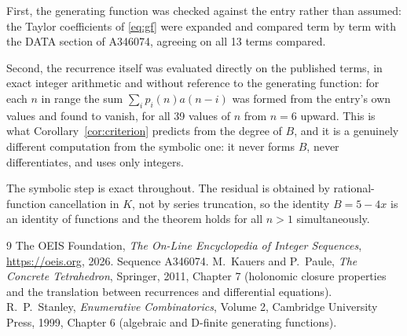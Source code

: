 \documentclass[11pt,a4paper]{article}
\theoremstyle{plain}
\theoremstyle{definition}
\begin{document}
First, the generating function was checked against the entry rather than assumed: the
Taylor coefficients of \eqref{eq:gf} were expanded and compared term by term with the DATA
section of A346074, agreeing on all 13 terms compared.

Second, the recurrence itself was evaluated directly on the published terms, in exact
integer arithmetic and without reference to the generating function: for each $n$ in range
the sum $\sum_{i}p_{i}(n)a(n-i)$ was formed from the entry's own values and found to
vanish, for all 39 values of $n$ from $n=6$ upward. This is what
Corollary~\ref{cor:criterion} predicts from the degree of $B$, and it is a genuinely
different computation from the symbolic one: it never forms $B$, never differentiates, and
uses only integers.

The symbolic step is exact throughout. The residual is obtained by rational-function
cancellation in $K$, not by series truncation, so the identity $B=5 - 4 x$ is an
identity of functions and the theorem holds for all $n>1$ simultaneously.

\begin{thebibliography}{9}
 The OEIS Foundation, \emph{The On-Line Encyclopedia of Integer Sequences},
\url{https://oeis.org}, 2026. Sequence A346074.
 M.~Kauers and P.~Paule, \emph{The Concrete Tetrahedron}, Springer, 2011,
Chapter 7 (holonomic closure properties and the translation between recurrences and
differential equations).
 R.~P.~Stanley, \emph{Enumerative Combinatorics}, Volume 2, Cambridge
University Press, 1999, Chapter 6 (algebraic and D-finite generating functions).
\end{thebibliography}
\end{document}
